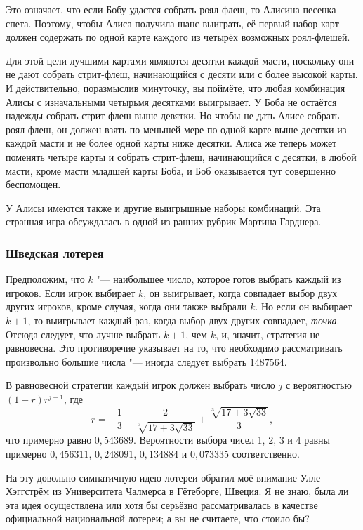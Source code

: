 \documentclass[twoside]{book}
\begin{document}
Это означает, что если Бобу удастся собрать роял-флеш, то Алисина песенка спета.
Поэтому, чтобы Алиса получила шанс выиграть, её первый набор карт должен содержать по одной карте каждого из четырёх возможных роял-флешей.

Для этой цели лучшими картами являются десятки каждой масти, поскольку они не дают собрать стрит-флеш, начинающийся с десяти или с более высокой карты.
И действительно, поразмыслив минуточку, вы поймёте, что любая комбинация Алисы с изначальными четырьмя десятками выигрывает.
У Боба не остаётся надежды собрать стрит-флеш выше девятки.
Но чтобы не дать Алисе собрать роял-флеш, он должен взять по меньшей мере по одной карте выше десятки из каждой масти и не более одной карты ниже десятки.
Алиса же теперь может поменять четыре карты и собрать стрит-флеш, начинающийся с десятки, в любой масти, кроме масти младшей карты Боба,
и Боб оказывается тут совершенно беспомощен.
\heart

У Алисы имеются также и другие выигрышные наборы комбинаций.
Эта странная игра обсуждалась в одной из ранних рубрик Мартина Гарднера. 

\subsubsection*{Шведская лотерея}%

Предположим, что $k$ "--- наибольшее число, которое готов выбрать каждый из игроков.
Если игрок выбирает $k$, он выигрывает, когда совпадает выбор двух других игроков, кроме случая, когда они также выбрали $k$.
Но если он выбирает $k+1$, то выигрывает каждый раз, когда выбор двух других совпадает, \emph{точка}.
Отсюда следует, что лучше выбрать $k+1$, чем $k$, и, значит, стратегия не равновесна.
Это противоречие указывает на то, что необходимо рассматривать произвольно большие числа "--- иногда следует выбрать $1487564$.
\heart

В равновесной стратегии каждый игрок должен выбрать число $j$ с вероятностью $(1-r)r^{j-1}$, где\vspace {-\jot}
\[r = -\frac13-\frac2{\sqrt[3]{17+3\sqrt{33}}}+\frac{\sqrt[3]{17+3\sqrt{33}}}3,\]
что примерно равно $0{,}543689$.
Вероятности выбора чисел 1, 2, 3 и 4 равны примерно $0{,}456311$, $0{,}248091$, $0{,}134884$ и $0{,}073335$ соответственно.

На эту довольно симпатичную идею лотереи обратил моё внимание Улле Хэггстрём из Университета Чалмерса в Гётеборге, Швеция. %
Я не знаю, была ли эта идея осуществлена или хотя бы серьёзно рассматривалась в качестве официальной национальной лотереи; а вы не считаете, что стоило бы?
\end{document}
